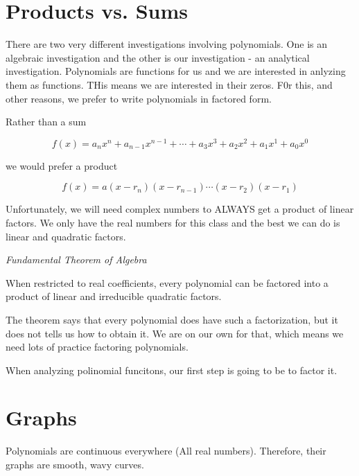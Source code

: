 \documentclass{ximera}
\begin{document}
\section{Products vs. Sums}


There are two very different investigations involving polynomials.  One is an algebraic investigation and the other is our investigation - an analytical investigation.  Polynomials are functions for us and we are interested in anlyzing them as functions.  THis means we are interested in their zeros.  F0r this, and other reasons, we prefer to write polynomials in factored form.



Rather than a sum

\[   f(x) = a_n x^n + a_{n-1} x^{n-1} + \cdots + a_3 x^3 + a_2 x^2 + a_1 x^1 + a_0 x^0      \]

we would prefer a product

\[   f(x) = a (x-r_n)(x-r_{n-1})  \cdots (x-r_2)(x-r_1)  \]





Unfortunately, we will need complex numbers to ALWAYS get a product of linear factors.  We only have the real numbers for this class and the best we can do is linear and quadratic factors.



\begin{theorem} \textit{Fundamental Theorem of Algebra}

When restricted to real coefficients, every polynomial can be factored into a product of linear and irreducible quadratic factors.

\end{theorem}


The theorem says that every polynomial does have such a factorization, but it does not tells us how to obtain it.  We are on our own for that, which means we need lots of practice factoring polynomials.

When analyzing polinomial funcitons, our first step is going to be to factor it.





\section {Graphs}




Polynomials are continuous everywhere (All real numbers).  Therefore, their graphs are smooth, wavy curves.
\end{document}
